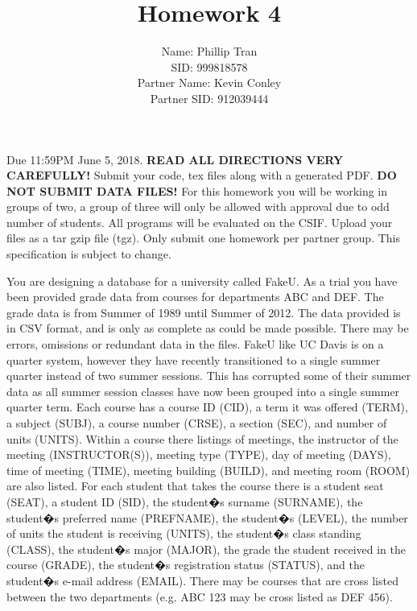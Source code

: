 \documentclass{article}
\begin{document}
\title{Homework 4}
\author{Name: Phillip Tran\\SID: 999818578\\Partner Name: Kevin Conley\\Partner SID: 912039444}

\maketitle

Due 11:59PM June 5, 2018. {\bf READ ALL DIRECTIONS VERY CAREFULLY!}
Submit your code, tex files along with a generated PDF. {\bf DO NOT SUBMIT DATA FILES!}
For this homework you will be working in groups of two, a group of three will only be allowed with approval due to odd number of students.
All programs will be evaluated on the CSIF. Upload your files as a tar gzip file (tgz). Only submit one homework per partner group. This specification is subject to change.

You are designing a database for a university called FakeU. As a trial you have been provided grade data from courses for departments ABC and DEF.
The grade data is from Summer of 1989 until Summer of 2012. The data provided is in CSV format, and is only as complete as could be made possible.
There may be errors, omissions or redundant data in the files.
FakeU like UC Davis is on a quarter system, however they have recently transitioned to a single summer quarter instead of two summer sessions.
This has corrupted some of their summer data as all summer session classes have now been grouped into a single summer quarter term.
Each course has a course ID (CID), a term it was offered (TERM), a subject (SUBJ), a course number (CRSE), a section (SEC), and number of units (UNITS).
Within a course there listings of meetings, the instructor of the meeting (INSTRUCTOR(S)), meeting type (TYPE), day of meeting (DAYS), time of meeting (TIME), meeting building (BUILD), and meeting room (ROOM) are also listed. For each student that takes the course there is a student seat (SEAT), a student ID (SID), the student�s surname (SURNAME), the student�s preferred name (PREFNAME), the student�s (LEVEL), the number of units the student is receiving (UNITS), the student�s class standing (CLASS), the student�s major (MAJOR), the grade the student received in the course (GRADE), the student�s registration status (STATUS), and the student�s e-mail address (EMAIL).
There may be courses that are cross listed between the two departments (e.g. ABC 123 may be cross listed as DEF 456).
\end{document}
